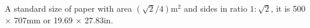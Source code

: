 A standard size of paper with area 
  $ ( \sqrt{2} / 4 ) \mathrm{m}^2 $ and sides in ratio
  $ 1 : \sqrt{2}$, 
  it is 500 \ensuremath{ \times } 707mm or 19.69 \ensuremath{\times} 27.83in.